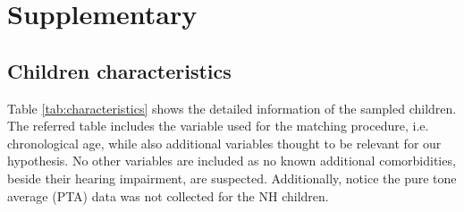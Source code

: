\section{Supplementary}
%
\subsection{Children characteristics} \label{sSA:characteristics}
%
Table \ref{tab:characteristics} shows the detailed information of the sampled children. The referred table includes the variable used for the matching procedure, i.e. chronological age, while also additional variables thought to be relevant for our hypothesis. No other variables are included as no known additional comorbidities, beside their hearing impairment, are suspected. Additionally, notice the pure tone average (PTA) data was not collected for the NH children.
%
